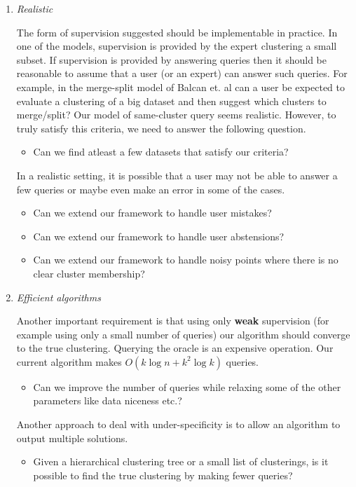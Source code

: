 \documentclass[letterpaper,12pt,titlepage,oneside,final]{book}
\begin{document}
\begin{enumerate}
\item \emph{Realistic}

The form of supervision suggested should be implementable in practice. In one of the models, supervision is provided by the expert clustering a small subset. If supervision is provided by answering queries then it should be reasonable to assume that a user (or an expert) can answer such queries. For example, in the merge-split model of Balcan et. al \cite{balcan2008clustering} can a user be expected to evaluate a clustering of a big dataset and then suggest which clusters to merge/split? Our model of same-cluster query seems realistic. However, to truly satisfy this criteria, we need to answer the following question. 
\begin{itemize}
\item Can we find atleast a few datasets that satisfy our criteria?
\end{itemize}
In a realistic setting, it is possible that a user may not be able to answer a few queries or maybe even make an error in some of the cases.
\begin{itemize}
\item Can we extend our framework to handle user mistakes? 
\item Can we extend our framework to handle user abstensions?
\item Can we extend our framework to handle noisy points where there is no clear cluster membership? 
\end{itemize}

\item \emph{Efficient algorithms}

Another important requirement is that using only \textbf{weak} supervision (for example using only a small number of queries) our algorithm should converge to the true clustering. Querying the oracle is an expensive operation. Our current algorithm makes $O(k\log n + k^2\log k)$ queries. 
\begin{itemize}
\item Can we improve the number of queries while relaxing some of the other parameters like data niceness etc.?
\end{itemize}
Another approach to deal with under-specificity is to allow an algorithm to output multiple solutions. 
\begin{itemize}
\item Given a hierarchical clustering tree or a small list of clusterings, is it possible to find the true clustering by making fewer queries?
\end{itemize}

\end{enumerate}
\end{document}
